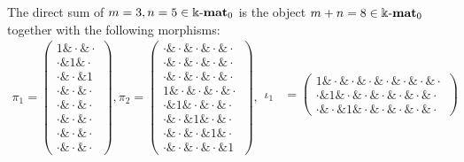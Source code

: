\begin{example}
The direct sum of $m = 3, n = 5 \in \Bbbk\textnormal{-}\mathbf{mat}_{0}$ is the object $m+n = 8 \in \Bbbk\textnormal{-}\mathbf{mat}_{0}$ together with the following morphisms:
\begin{align*}
\pi_{1} = \begin{pmatrix}
1 \ampersand \cdot \ampersand \cdot \\
\cdot \ampersand 1 \ampersand \cdot \\
\cdot \ampersand \cdot \ampersand 1 \\
\cdot \ampersand \cdot \ampersand \cdot \\
\cdot \ampersand \cdot \ampersand \cdot \\
\cdot \ampersand \cdot \ampersand \cdot \\
\cdot \ampersand \cdot \ampersand \cdot \\
\cdot \ampersand \cdot \ampersand \cdot
\end{pmatrix},
\pi_{2} = \begin{pmatrix}
\cdot \ampersand \cdot \ampersand \cdot \ampersand \cdot \ampersand \cdot \\
\cdot \ampersand \cdot \ampersand \cdot \ampersand \cdot \ampersand \cdot \\
\cdot \ampersand \cdot \ampersand \cdot \ampersand \cdot \ampersand \cdot \\
1 \ampersand \cdot \ampersand \cdot \ampersand \cdot \ampersand \cdot \\
\cdot \ampersand 1 \ampersand \cdot \ampersand \cdot \ampersand \cdot \\
\cdot \ampersand \cdot \ampersand 1 \ampersand \cdot \ampersand \cdot \\
\cdot \ampersand \cdot \ampersand \cdot \ampersand 1 \ampersand \cdot \\
\cdot \ampersand \cdot \ampersand \cdot \ampersand \cdot \ampersand 1
\end{pmatrix}, 
\begin{array}{rr}
\iota_{1} &= \begin{pmatrix}
1 \ampersand \cdot \ampersand \cdot \ampersand \cdot \ampersand \cdot \ampersand \cdot \ampersand \cdot \ampersand \cdot \\
\cdot \ampersand 1 \ampersand \cdot \ampersand \cdot \ampersand \cdot \ampersand \cdot \ampersand \cdot \ampersand \cdot \\
\cdot \ampersand \cdot \ampersand 1 \ampersand \cdot \ampersand \cdot \ampersand \cdot \ampersand \cdot \ampersand \cdot
\end{pmatrix} \\

\end{array}
\end{align*}
\end{example}
